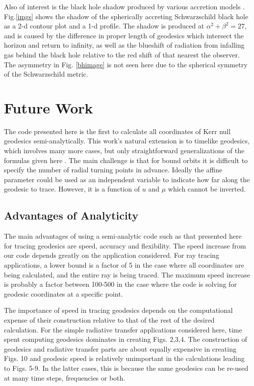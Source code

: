 \documentclass[apj]{emulateapj}
\begin{document}
Also of interest is the black hole shadow produced by various accretion models \citep{falcke}. Fig.\hspace{2pt}\ref{imgs} shows the shadow of the spherically accreting Schwarzschild black hole as a 2-d contour plot and a 1-d profile. The shadow is produced at $\alpha^2 + \beta^2 = 27$, and is caused by the difference in proper length of geodesics which intersect the horizon and return to infinity, as well as the  blueshift of radiation from infalling gas behind the black hole relative to the red shift of that nearest the observer. The asymmetry in Fig. \ref{bhimage} is not seen here due to the spherical symmetry of the Schwarzschild metric.

\section{Future Work}

\label{discussion}

The code presented here is the first to calculate all coordinates of Kerr null geodesics semi-analytically. This work's natural extension is to timelike geodesics, which involves many more cases, but only straightforward generalizations of the formulas given here . The main challenge is that for bound orbits it is difficult to specify the number of radial turning points in advance. Ideally the affine parameter could be used as an independent variable to indicate how far along the geodesic to trace. However, it is a function of $u$ and $\mu$ which cannot be inverted.

\subsection{Advantages of Analyticity}

The main advantages of using a semi-analytic code such as that presented here for tracing geodesics are speed, accuracy and flexibility. The speed increase from our code depends greatly on the application considered. For ray tracing applications, a lower bound is a factor of 5 in the case where all coordinates are being calculated, and the entire ray is being traced. The maximum speed increase is probably a factor between 100-500 in the case where the code is solving for geodesic coordinates at a specific point. 

The importance of speed in tracing geodesics depends on the computational expense of their construction relative to that of the rest of the desired calculation. For the simple radiative transfer applications considered here, time spent computing geodesics dominates in creating Figs. 2,3,4. The construction of geodesics and radiative transfer parts are about equally expensive in creating Figs. 10 and geodesic speed is relatively unimportant in the calculations leading to Figs. 5-9. In the latter cases, this is because the same geodesics can be re-used at many time steps, frequencies or both.
\end{document}
